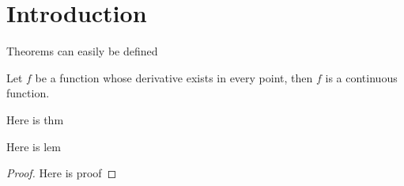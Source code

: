 
\section{Introduction}
Theorems can easily be defined

\begin{theorem}
Let $f$ be a function whose derivative exists in every point, then $f$ 
is a continuous function.
\end{theorem}

\begin{thm}
    Here is thm
\end{thm}
\begin{lem}
    Here is lem
\end{lem}
\begin{proof}
    Here is proof
\end{proof}
